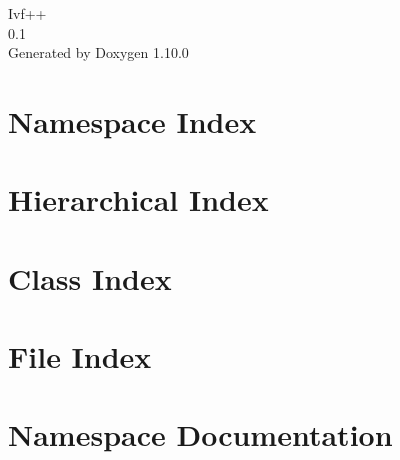 \documentclass[twoside]{book}
\newcommand{\+}{\discretionary{\mbox{\scriptsize$\hookleftarrow$}}{}{}}
\newcommand{\clearemptydoublepage}{%
    \newpage{\pagestyle{empty}\cleardoublepage}%
  }
\begin{document}
  \raggedbottom
    \hypersetup{pageanchor=false,
                bookmarksnumbered=true,
                pdfencoding=unicode
               }
  \begin{titlepage}
  \vspace*{7cm}
  \begin{center}%
  {\Large Ivf++}\\
  [1ex]\large 0.\+1 \\
  \vspace*{1cm}
  {\large Generated by Doxygen 1.10.0}\\
  \end{center}
  \end{titlepage}
  \clearemptydoublepage
  \tableofcontents
  \clearemptydoublepage
  \hypersetup{pageanchor=true}
\chapter{Namespace Index}

\chapter{Hierarchical Index}

\chapter{Class Index}

\chapter{File Index}

\chapter{Namespace Documentation}

\end{document}
